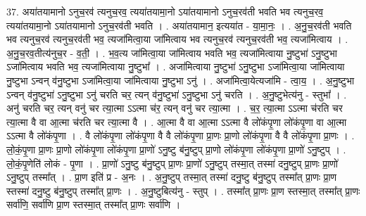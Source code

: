 \documentclass[17pt]{extarticle}
\begin{document}
37. अया॑तयामानो ऽनुच॒रव॑ त्यनुच॒रव॒ त्यया॑तयामा॒नो ऽया॑तयामानो ऽनुच॒रव॑ती भवति भव त्यनुच॒रव॒ त्यया॑तयामा॒नो ऽया॑तयामानो ऽनुच॒रव॑ती भवति । . अया॑तयामान॒ इत्यया॑त - या॒मा॒नः॒ । . अ॒नु॒च॒रव॑ती भवति भव त्यनुच॒रव॑ त्यनुच॒रव॑ती भव॒ त्यजा॑मित्वा॒या जा॑मित्वाय भव त्यनुच॒रव॑ त्यनुच॒रव॑ती भव॒ त्यजा॑मित्वाय । . अ॒नु॒च॒रव॒तीत्य॑नुच॒र - व॒ती॒ । . भ॒व॒त्य जा॑मित्वा॒या जा॑मित्वाय भवति भव॒ त्यजा॑मित्वाया नु॒ष्टुभा॑ ऽनु॒ष्टुभा ऽजा॑मित्वाय भवति भव॒
त्यजा॑मित्वाया नु॒ष्टुभा᳚ । . अजा॑मित्वाया नु॒ष्टुभा॑ ऽनु॒ष्टुभा ऽजा॑मित्वा॒या जा॑मित्वाया नु॒ष्टुभा ऽन्वन् व॑नु॒ष्टुभा ऽजा॑मित्वा॒या जा॑मित्वाया नु॒ष्टुभा ऽनु॑ । . अजा॑मित्वा॒येत्यजा॑मि - त्वा॒य॒ । . अ॒नु॒ष्टुभा ऽन्वन् व॑नु॒ष्टुभा॑ ऽनु॒ष्टुभा ऽनु॑ चरति चर॒ त्यन् व॑नु॒ष्टुभा॑ ऽनु॒ष्टुभा ऽनु॑ चरति । . अ॒नु॒ष्टुभेत्य॑नु - स्तुभा᳚ । . अनु॑ चरति चर॒ त्यन् वनु॑ चर त्या॒त्मा ऽऽत्मा च॑र॒ त्यन् वनु॑ चर त्या॒त्मा । . च॒र॒ त्या॒त्मा ऽऽत्मा च॑रति चर त्या॒त्मा वै वा आ॒त्मा च॑रति चर त्या॒त्मा वै । . आ॒त्मा वै वा आ॒त्मा ऽऽत्मा वै लो॑कंपृ॒णा लो॑कंपृ॒णा वा आ॒त्मा ऽऽत्मा वै लो॑कंपृ॒णा । . वै लो॑कंपृ॒णा लो॑कंपृ॒णा वै वै लो॑कंपृ॒णा प्रा॒णः प्रा॒णो लो॑कंपृ॒णा वै वै लो॑कंपृ॒णा प्रा॒णः । . लो॒कं॒पृ॒णा प्रा॒णः प्रा॒णो लो॑कंपृ॒णा लो॑कंपृ॒णा प्रा॒णो॑ ऽनु॒ष्टु ब॑नु॒ष्टुप् प्रा॒णो लो॑कंपृ॒णा लो॑कंपृ॒णा प्रा॒णो॑ ऽनु॒ष्टुप् । . लो॒कं॒पृ॒णेति॑ लोकं - पृ॒णा । . प्रा॒णो॑ ऽनु॒ष्टु ब॑नु॒ष्टुप् प्रा॒णः प्रा॒णो॑ ऽनु॒ष्टुप् तस्मा॒त् तस्मा॑ दनु॒ष्टुप् प्रा॒णः प्रा॒णो॑ ऽनु॒ष्टुप् तस्मा᳚त् । . प्रा॒ण इति॑ प्र - अ॒नः । . अ॒नु॒ष्टुप् तस्मा॒त् तस्मा॑ दनु॒ष्टु ब॑नु॒ष्टुप् तस्मा᳚त् प्रा॒णः प्रा॒ण स्तस्मा॑ दनु॒ष्टु ब॑नु॒ष्टुप् तस्मा᳚त् प्रा॒णः । . अ॒नु॒ष्टुबित्य॑नु - स्तुप् । . तस्मा᳚त् प्रा॒णः प्रा॒ण स्तस्मा॒त् तस्मा᳚त् प्रा॒णः सर्वा॑णि॒ सर्वा॑णि प्रा॒ण स्तस्मा॒त् तस्मा᳚त् प्रा॒णः सर्वा॑णि । \newline
\end{document}

